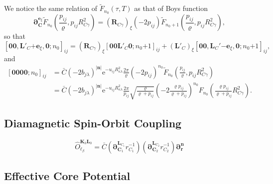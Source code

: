 \documentclass[a4paper,11pt,twoside,openright]{book}
\begin{document}
We notice the same relation of $\tilde{F}_{n_{0}}\left(\tau,T\right)$ as that of Boys function
\begin{equation}
  \boldsymbol{\partial}_{\boldsymbol{C}}^{\boldsymbol{e}_{\xi}}\tilde{F}_{n_{0}}\left(\frac{p_{ij}}{\varrho},p_{ij}R_{C\gamma}^2\right)
  =(\boldsymbol{R}_{C\gamma})_{\xi}(-2p_{ij})\tilde{F}_{n_{0}+1}\left(\frac{p_{ij}}{\varrho},p_{ij}R_{C\gamma}^2\right),
\end{equation}
so that
\begin{equation}
  \label{eq:gaupot-geo-c}
  \left[\boldsymbol{00},\boldsymbol{L}'_{C}\mathrm{+}\boldsymbol{e}_{\xi},\boldsymbol{0};n_{0}\right]_{ij}
  =(\boldsymbol{R}_{C\gamma})_{\xi}\left[\boldsymbol{00}\boldsymbol{L}'_{C}\boldsymbol{0};n_{0}\mathrm{+}1\right]_{ij}%
  +(\boldsymbol{L}'_{C})_{\xi}\left[\boldsymbol{00},\boldsymbol{L}_{C}'\mathrm{-}\boldsymbol{e}_{\xi},%
    \boldsymbol{0};n_{0}\mathrm{+}1\right]_{ij},
\end{equation}
and
\begin{align}
  \left[\boldsymbol{0000};n_{0}\right]_{ij}
  &=\bar{C}(-2b_{j\lambda})^{|\boldsymbol{n}|}\mathrm{e}^{-u_{ij}R_{\kappa\lambda}^2}%
    \frac{2\pi}{\varrho}(-2p_{ij})^{n_{0}}\tilde{F}_{n_{0}}\left(\frac{p_{ij}}{\varrho},p_{ij}R_{C\gamma}^2\right)\\
  &=\bar{C}(-2b_{j\lambda})^{|\boldsymbol{n}|}\mathrm{e}^{-u_{ij}R_{\kappa\lambda}^2}%
    \frac{2\pi}{p_{ij}}\sqrt{\frac{\varrho}{\varrho+p_{ij}}}%
    \left(-2\frac{\varrho p_{ij}}{\varrho+p_{ij}}\right)^{n_{0}}%
    F_{n_{0}}\left(\frac{\varrho p_{ij}}{\varrho+p_{ij}}R_{C\gamma}^2\right).\nonumber
\end{align}

\subsection{Diamagnetic Spin-Orbit Coupling}
\label{subsec:dso}

\begin{equation}
  \hat{O}_{\ell_{\beta}}^{\boldsymbol{K}_{0}\boldsymbol{L}_{0}}%
    =\bar{C}\left(\boldsymbol{\partial}_{\boldsymbol{C}_{1}}^{\boldsymbol{L}_{C_{1}}}r_{C_{1}}^{-1}\right)%
      \left(\boldsymbol{\partial}_{\boldsymbol{C}_{2}}^{\boldsymbol{L}_{C_{2}}}r_{C_{2}}^{-1}\right)%
      \boldsymbol{\partial}_{\boldsymbol{r}}^{\boldsymbol{n}}
\end{equation}

\subsection{Effective Core Potential}
\label{subsec:ecp}
\end{document}
